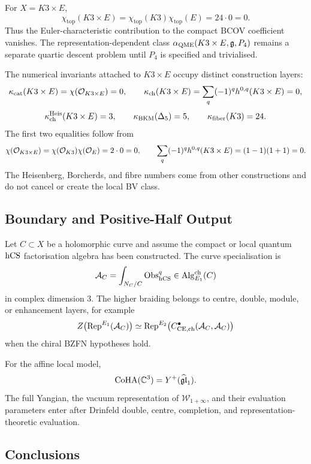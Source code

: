 For \(X=K3\times E\),
\[
  \chi_{\mathrm{top}}(K3\times E)
  =
  \chi_{\mathrm{top}}(K3)\chi_{\mathrm{top}}(E)
  =
  24\cdot0=0.
\]
Thus the Euler-characteristic contribution to the compact BCOV
coefficient vanishes. The representation-dependent class
\(\alpha_{\mathrm{QME}}(K3\times E,\mathfrak{g},P_4)\) remains a separate
quartic descent problem until \(P_4\) is specified and trivialised.

The numerical invariants attached to \(K3\times E\) occupy distinct
construction layers:
\[
  \kappa_{\mathrm{cat}}(K3\times E)=\chi(\mathcal{O}_{K3\times E})=0,
  \qquad
  \kappa_{\mathrm{ch}}(K3\times E)=\sum_q(-1)^q h^{0,q}(K3\times E)=0,
\]
\[
  \kappa_{\mathrm{ch}}^{\mathrm{Heis}}(K3\times E)=3,
  \qquad
  \kappa_{\mathrm{BKM}}(\Delta_5)=5,
  \qquad
  \kappa_{\mathrm{fiber}}(K3)=24.
\]
The first two equalities follow from
\[
  \chi(\mathcal{O}_{K3\times E})
  =
  \chi(\mathcal{O}_{K3})\chi(\mathcal{O}_E)
  =
  2\cdot0=0,
  \qquad
  \sum_q(-1)^qh^{0,q}(K3\times E)=(1-1)(1+1)=0.
\]
The Heisenberg, Borcherds, and fibre numbers come from other
constructions and do not cancel or create the local BV class.

\subsection{Boundary and Positive-Half Output}
\label{subsec:hcs-boundary-positive-half}

Let \(C\subset X\) be a holomorphic curve and assume the compact or
local quantum \(\mathrm{hCS}\) factorisation algebra has been constructed. The
curve specialisation is
\[
  \mathcal A_C=\int_{N_C/C}\mathrm{Obs}^q_{\mathrm{hCS}}
  \in
  \operatorname{Alg}^{\mathrm{ch}}_{E_1}(C)
\]
in complex dimension \(3\). The higher braiding belongs to centre,
double, module, or enhancement layers, for example
\[
  Z\bigl(\operatorname{Rep}^{E_1}(\mathcal A_C)\bigr)
  \simeq
  \operatorname{Rep}^{E_2}\bigl(
    C^\bullet_{\mathrm{CE},\mathrm{ch}}(\mathcal A_C,\mathcal A_C)
  \bigr)
\]
when the chiral BZFN hypotheses hold.

For the affine local model,
\[
  \operatorname{CoHA}(\mathbb{C}^3)=Y^+(\widehat{\mathfrak{gl}}_1).
\]
The full Yangian, the vacuum representation of
\(\mathcal W_{1+\infty}\), and their evaluation parameters enter after
Drinfeld double, centre, completion, and representation-theoretic
evaluation.

\subsection{Conclusions}
\label{subsec:hcs-nonabelian-anomaly-conclusions}

